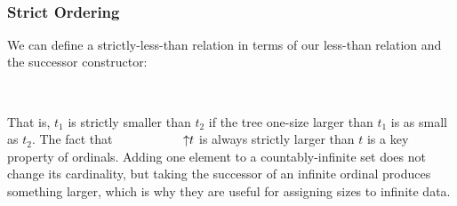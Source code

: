 \begin{code}[hide]%
\>[0]\<%
\\
%
\>[4]\AgdaSpace{}%
\AgdaSpace{}%
\<%
\end{code}


\subsubsection{Strict Ordering}

We can define a strictly-less-than relation in terms of our less-than relation
and the successor constructor:
\begin{code}%
%
\>[4]\AgdaOperator{\AgdaFunction{\AgdaUnderscore{}<\AgdaUnderscore{}}}\AgdaSpace{}%
\AgdaSymbol{:}\AgdaSpace{}%
\AgdaSpace{}%
\AgdaSpace{}%
\AgdaSpace{}%
\AgdaSpace{}%
\AgdaSpace{}%
\<%
\\
%
\>[4]\AgdaSpace{}%
\AgdaOperator{\AgdaFunction{<}}\AgdaSpace{}%
\AgdaSpace{}%
\AgdaSymbol{=}\AgdaSpace{}%
\AgdaSpace{}%
\AgdaSpace{}%
\AgdaSpace{}%
\<%
\end{code}

  That is,  $t_{1}$ is strictly smaller than $t_{2}$ if the tree one-size larger than $t_{1}$ is as small as $t_{2}$.
  The fact that $\up t$ is always strictly larger than $t$ is a key property of ordinals.
  Adding one element to a countably-infinite set does not change its cardinality, but taking the
  successor of an infinite ordinal produces something larger, which is why they are useful
  for assigning sizes to infinite data.

